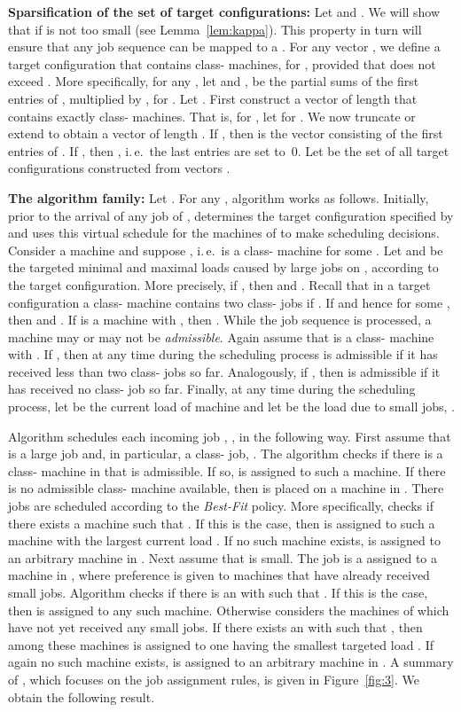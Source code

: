 \documentclass{llncs}
\begin{document}
{\bf Sparsification of the set of target configurations:} Let  and
. We will show that 
 if  is not too small (see Lemma~\ref{lem:kappa}).
This property in turn will ensure that any job sequence  can be mapped to a .
For any vector , we define a target configuration
 that contains  class- machines, for , 
provided that  does not exceed . More specifically,
for any , let  and ,
be the partial sums of the first  entries of , multiplied by , for
. Let . First construct a vector 
of length  that contains exactly  class- machines.
That is, for , let  for . We now truncate
or extend  to obtain a vector of length . If , then  is the vector consisting
of the first  entries of . If , then , i.\,e.\
the last  entries are set to~0. Let  be the set of all target configurations
constructed from vectors .

{\bf The algorithm family:} Let . For any , algorithm
 works as follows. Initially, prior to the arrival of any job of ,  determines
the target configuration specified by  and uses this virtual schedule for
the machines of  to make scheduling decisions. Consider a machine  and
suppose , i.\,e.\  is a class- machine  for some . Let  and 
be the targeted minimal and maximal loads caused by large jobs on , according to the target
configuration. More precisely, if , then   and  . 
Recall that in a target configuration a class- machine contains two class- jobs if .
If  and hence  for some , then   
and  . If  is 
a machine with , then . While the job sequence  is processed,
a machine  may or may not be {\em admissible\/}. Again assume that  is a class-
machine with . If , then at any time during the scheduling process  is
admissible if it has received less than two class- jobs so far. Analogously, if  ,
then  is admissible if it has received no class- job so far. Finally, at any time during the
scheduling process, let  be the current load of machine  and let  be the
load due to small jobs, .

Algorithm  schedules each incoming job , , in the following way. First assume
that  is a large job and, in particular, a class- job, . The algorithm checks
if there is a class- machine in  that is admissible. If so,  is assigned to such a machine.
If there is no admissible class- machine available, then  is placed on a machine in .
There jobs are scheduled according to the {\em Best-Fit\/} policy. More specifically,  checks if there exists
a machine  such that . If this is the case, then  is
assigned to such a machine with the largest current load . If no such machine exists, 
is assigned to an arbitrary machine in . Next assume that  is small. The job is a assigned
to a machine in , where preference is given to machines that have already received small jobs. 
Algorithm  checks if there is an  with  such that 
. If this is the case, then  is assigned to any such machine.
Otherwise  considers the machines of  which have not yet received any small jobs. If there exists
an  with  such that , then among these
machines  is assigned to one having the smallest targeted load . 
If again no such machine exists,   is assigned to an arbitrary machine in . A summary of  
, which focuses on the job assignment rules, is given in Figure~\ref{fig:3}. We obtain the following result.
\end{document}

